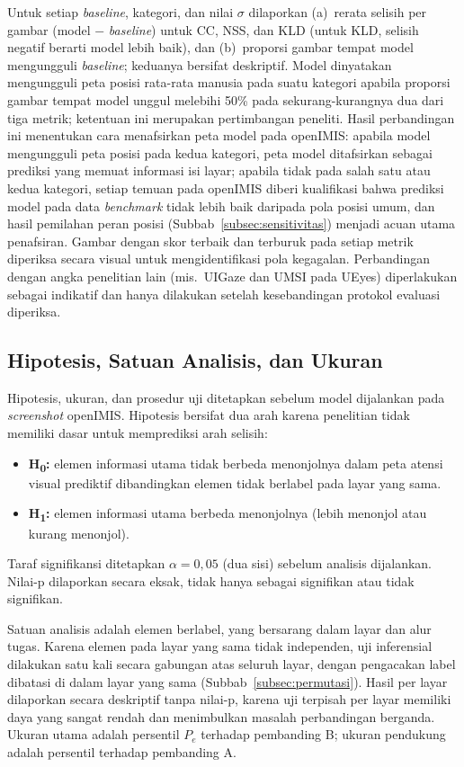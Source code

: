 Untuk setiap \emph{baseline}, kategori, dan nilai $\sigma$ dilaporkan (a)~rerata selisih per gambar (model $-$ \emph{baseline}) untuk CC, NSS, dan KLD (untuk KLD, selisih negatif berarti model lebih baik), dan (b)~proporsi gambar tempat model mengungguli \emph{baseline}; keduanya bersifat deskriptif. Model dinyatakan mengungguli peta posisi rata-rata manusia pada suatu kategori apabila proporsi gambar tempat model unggul melebihi 50\% pada sekurang-kurangnya dua dari tiga metrik; ketentuan ini merupakan pertimbangan peneliti. Hasil perbandingan ini menentukan cara menafsirkan peta model pada openIMIS: apabila model mengungguli peta posisi pada kedua kategori, peta model ditafsirkan sebagai prediksi yang memuat informasi isi layar; apabila tidak pada salah satu atau kedua kategori, setiap temuan pada openIMIS diberi kualifikasi bahwa prediksi model pada data \emph{benchmark} tidak lebih baik daripada pola posisi umum, dan hasil pemilahan peran posisi (Subbab~\ref{subsec:sensitivitas}) menjadi acuan utama penafsiran. Gambar dengan skor terbaik dan terburuk pada setiap metrik diperiksa secara visual untuk mengidentifikasi pola kegagalan. Perbandingan dengan angka penelitian lain (mis.\ UIGaze dan UMSI pada UEyes) diperlakukan sebagai indikatif dan hanya dilakukan setelah kesebandingan protokol evaluasi diperiksa.

\subsection{Hipotesis, Satuan Analisis, dan Ukuran}
\label{subsec:hipotesis}

Hipotesis, ukuran, dan prosedur uji ditetapkan sebelum model dijalankan pada \emph{screenshot} openIMIS. Hipotesis bersifat dua arah karena penelitian tidak memiliki dasar untuk memprediksi arah selisih:
\begin{itemize}
  \item \textbf{H\textsubscript{0}:} elemen informasi utama tidak berbeda menonjolnya dalam peta atensi visual prediktif dibandingkan elemen tidak berlabel pada layar yang sama.
  \item \textbf{H\textsubscript{1}:} elemen informasi utama berbeda menonjolnya (lebih menonjol atau kurang menonjol).
\end{itemize}

Taraf signifikansi ditetapkan $\alpha = 0{,}05$ (dua sisi) sebelum analisis dijalankan. Nilai-p dilaporkan secara eksak, tidak hanya sebagai signifikan atau tidak signifikan.

Satuan analisis adalah elemen berlabel, yang bersarang dalam layar dan alur tugas. Karena elemen pada layar yang sama tidak independen, uji inferensial dilakukan satu kali secara gabungan atas seluruh layar, dengan pengacakan label dibatasi di dalam layar yang sama (Subbab~\ref{subsec:permutasi}). Hasil per layar dilaporkan secara deskriptif tanpa nilai-p, karena uji terpisah per layar memiliki daya yang sangat rendah dan menimbulkan masalah perbandingan berganda. Ukuran utama adalah persentil $P_e$ terhadap pembanding B; ukuran pendukung adalah persentil terhadap pembanding A.

